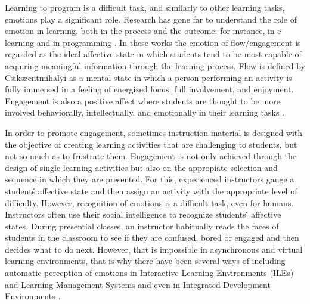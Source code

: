 \documentclass[a4paper,twoside]{article}
\begin{document}
Learning to program is a difficult task, and similarly to other
learning tasks, emotions play a significant
role. Research has gone far to understand the role of emotion in learning, both
in the process and the outcome; for instance, in e-learning
\cite{kort2001affective, rossin2009effects}
and in programming  \cite{rodrigo2009affective, jenkins2001motivation ,
bosch2013emotions, khan2007mood}. In these works the emotion of flow/engagement
is regarded as the ideal affective state in which
students tend to be most capable of acquiring meaningful information through the
learning process. Flow is defined by Csikszentmihalyi \cite{csikszentmihalyi1990flow}
as a mental state in which a person performing an activity is fully immersed in a feeling of energized focus, full involvement, and enjoyment. Engagement is
also a positive affect where students are thought to be more involved
behaviorally, intellectually, and emotionally in their learning tasks
\cite{bangert2002teacher}.

In order to promote engagement, sometimes instruction material is designed with the
objective of creating learning activities that are challenging to students, but
not so much as to frustrate them. Engagement is not only achieved through the
design of single learning activities but also on the appropiate selection and
sequence in which they are presented.
For this, experienced instructors gauge a student\'s affective state and then
assign an activity with the appropriate level of difficulty. However,
recognition of emotions is a difficult task, even
for humans. Instructors often use their social intelligence to recognize
students\'' affective states. During presential  classes, an instructor habitually reads the
faces of students in the classroom to see if they are confused, bored or
engaged and then decides what to do next. However, that is impossible
in asynchronous and virtual learning environments, that is why there
have been several ways of including automatic perception of emotions
in Interactive Learning Environments (ILEs) and Learning Management
Systems \cite{gottardo2017affective} and even in Integrated
Development Environments \cite{hundhausen2017ide}.
\end{document}
